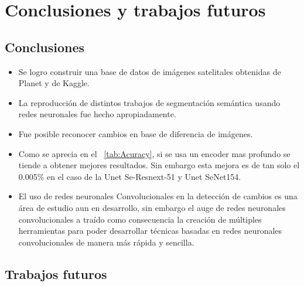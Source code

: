 \chapter{Conclusiones y trabajos futuros}
\section*{Conclusiones}

\label{chap:conclusiones}

\begin{itemize}
  \item Se logro construir una base de datos de imágenes satelitales obtenidas de Planet y de Kaggle.


 \item La reproducción de distintos trabajos de segmentación semántica usando redes neuronales fue hecho apropiadamente.

 \item Fue posible reconocer cambios en base de diferencia de imágenes.
    \item Como se aprecia en el \tablename~\ref{tab:Acuracy}, si se usa un encoder mas profundo se tiende a obtener mejores resultados. Sin embargo esta mejora es de tan solo el 0.005\% en el caso de la Unet Se-Resnext-51 y Unet SeNet154.
    
    \item El uso de redes neuronales Convolucionales en la detección de cambios es una área de estudio aun en desarrollo, sin embargo el auge de redes neuronales convolucionales a traído como consecuencia la creación de múltiples herramientas para poder desarrollar técnicas basadas en redes neuronales convolucionales de manera más rápida y sencilla.
    \end{itemize}{}



\section{Trabajos futuros}